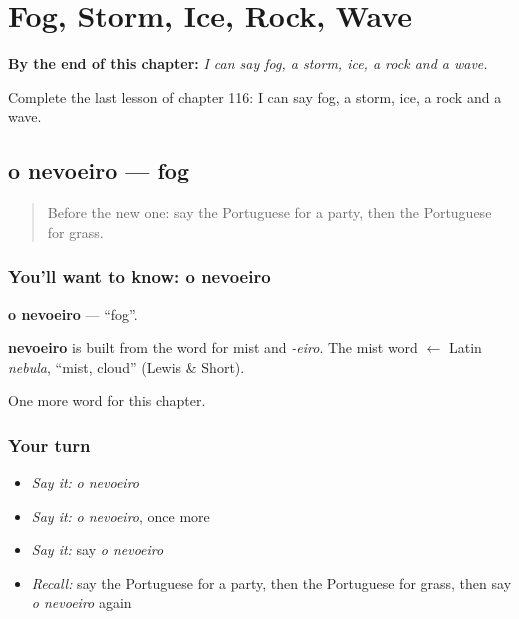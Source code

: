 
\chapter{Fog, Storm, Ice, Rock, Wave}
\label{ch:pt-fog-storm-ice-rock-wave}

\begin{chapteropening}
\textbf{By the end of this chapter:} \emph{I can say fog, a storm, ice, a rock and a wave.}

Complete the last lesson of chapter 116: I can say fog, a storm, ice, a rock and a wave.
\end{chapteropening}

\section[o nevoeiro]{o nevoeiro — fog}

\label{lesson:PT-C116-nevoeiro}



\begin{quote}
Before the new one: say the Portuguese for a party, then the Portuguese for grass.
\end{quote}

\subsection*{You'll want to know: o nevoeiro}
\textbf{o nevoeiro} — \textquotedblleft{}fog\textquotedblright{}.

\begin{cousinweb}
\textbf{nevoeiro} is built from the word for mist and \emph{-eiro}. The mist word $\leftarrow$ Latin \emph{nebula}, \textquotedblleft{}mist, cloud\textquotedblright{} (Lewis \& Short).
\end{cousinweb}

\begin{grammarlens}[title={What you've built}]
One more word for this chapter.
\end{grammarlens}

\subsection*{Your turn}
\begin{itemize}
\raggedright
  \item \emph{Say it:} \emph{o nevoeiro}
  \item \emph{Say it:} \emph{o nevoeiro}, once more
  \item \emph{Say it:} say \emph{o nevoeiro}
  \item \emph{Recall:} say the Portuguese for a party, then the Portuguese for grass, then say \emph{o nevoeiro} again
\end{itemize}

